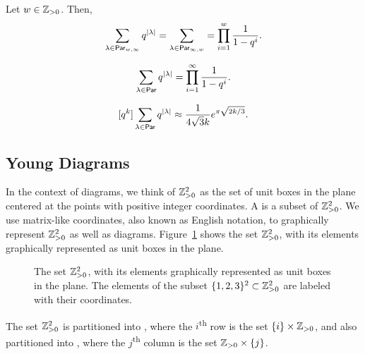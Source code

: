 \begin{theorem}
    Let \(w \in \mathbb{Z}_{> 0}\).
    Then,
    \[
        \sum_{\lambda \in \operatorname{\mathsf{Par}}_{w, \infty}} q^{|\lambda|}
        = \sum_{\lambda \in \operatorname{\mathsf{Par}}_{\infty, w}}
        = \prod_{i=1}^{w} \frac{1}{1 - q^i}.
    \]
\end{theorem}

\begin{corollary}
    \[
        \sum_{\lambda \in \operatorname{\mathsf{Par}}} q^{|\lambda|}
        = \prod_{i=1}^{\infty} \frac{1}{1 - q^i}.
    \]
\end{corollary}

\begin{theorem}
    \[
        [q^k] \sum_{\lambda \in \operatorname{\mathsf{Par}}} q^{|\lambda|}
        \approx \frac{1}{4 \sqrt{3} k} e^{\pi \sqrt{2k/3}}.
    \]
\end{theorem}

\subsection{Young Diagrams} \label{subsec:diagrams}

In the context of diagrams,
we think of \(\mathbb{Z}_{> 0}^2\) as the set of unit boxes in the plane centered at the points with positive integer coordinates.
A  is a subset of \(\mathbb{Z}_{> 0}^2\).
We use matrix-like coordinates, also known as English notation, to graphically represent \(\mathbb{Z}_{> 0}^2\) as well as diagrams.
Figure~\ref{fig:positives2} shows the set \(\mathbb{Z}_{> 0}^2\), with its elements graphically represented as unit boxes in the plane.
\begin{figure}[htbp]
    \centering
    \caption{The set \(\mathbb{Z}_{> 0}^2\), with its elements graphically represented as unit boxes in the plane. The elements of the subset \(\interval{3}^2 \subset \positives^2\) are labeled with their coordinates.}
    \label{fig:positives2}
\end{figure}

The set \(\mathbb{Z}_{> 0}^2\) is partitioned into , where the \(i\)\textsuperscript{th} row is the set \(\{i\} \times \mathbb{Z}_{> 0}\),
and also partitioned into , where the \(j\)\textsuperscript{th} column is the set \(\mathbb{Z}_{> 0} \times \{j\}\).

